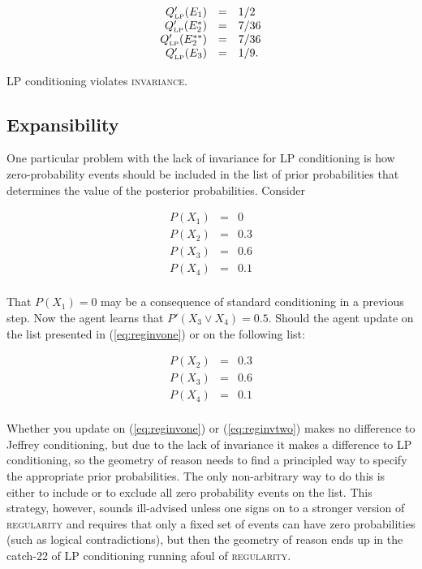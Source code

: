 \documentclass[phd,12pt,oneside]{ubcthesis}
\begin{document}
\begin{equation}
  \label{eq:marpleposteriorlp}
  \begin{array}{rcl}
  Q'_{\mbox{\tiny LP}}(E_{1})&=&1/2\\
  Q'_{\mbox{\tiny LP}}(E_{2}^{*})&=&7/36\\
  Q'_{\mbox{\tiny LP}}(E_{2}^{**})&=&7/36\\
  Q'_{\mbox{\tiny LP}}(E_{3})&=&1/9.
\end{array}
\end{equation}

{\noindent}LP conditioning violates \textsc{invariance}.

\subsection{Expansibility}
\label{Expansibility}

One particular problem with the lack of invariance for LP conditioning
is how zero-probability events should be included in the list of prior
probabilities that determines the value of the posterior
probabilities. Consider

\begin{equation}
  \label{eq:reginvone}
  \begin{array}{rcl}
  P(X_{1})&=&0\\
  P(X_{2})&=&0.3\\
  P(X_{3})&=&0.6\\
  P(X_{4})&=&0.1\\
\end{array}
\end{equation}

{\noindent}That $P(X_{1})=0$ may be a consequence of standard conditioning in a
previous step. Now the agent learns that $P'(X_{3}\vee{}X_{4})=0.5$.
Should the agent update on the list presented in (\ref{eq:reginvone})
or on the following list:

\begin{equation}
  \label{eq:reginvtwo}
  \begin{array}{rcl}
  P(X_{2})&=&0.3\\
  P(X_{3})&=&0.6\\
  P(X_{4})&=&0.1\\
\end{array}
\end{equation}

{\noindent}Whether you update on (\ref{eq:reginvone}) or (\ref{eq:reginvtwo})
makes no difference to Jeffrey conditioning, but due to the lack of
invariance it makes a difference to LP conditioning, so the geometry
of reason needs to find a principled way to specify the appropriate
prior probabilities. The only non-arbitrary way to do this is either
to include or to exclude all zero probability events on the list. This
strategy, however, sounds ill-advised unless one signs on to a
stronger version of \textsc{regularity} and requires that only a fixed
set of events can have zero probabilities (such as logical
contradictions), but then the geometry of reason ends up in the
catch-22 of LP conditioning running afoul of \textsc{regularity}.
\end{document}
